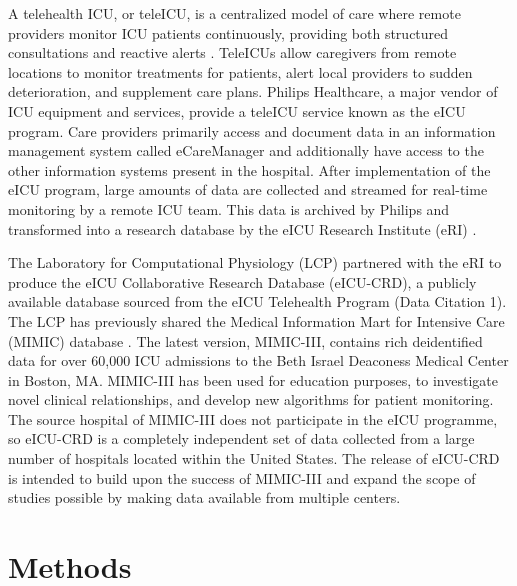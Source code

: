 \documentclass[english]{article}
\begin{document}
A telehealth ICU, or teleICU, is a centralized model of care where remote providers monitor ICU patients continuously, providing both structured consultations and reactive alerts \cite{lilly2014multicenter}. TeleICUs allow caregivers from remote locations to monitor treatments for patients, alert local providers to sudden deterioration, and supplement care plans.
Philips Healthcare, a major vendor of ICU equipment and services, provide a teleICU service known as the eICU program.
Care providers primarily access and document data in an information management system called eCareManager and additionally have access to the other information systems present in the hospital.
After implementation of the eICU program, large amounts of data are collected and streamed for real-time monitoring by a remote ICU team.
This data is archived by Philips and transformed into a research database by the eICU Research Institute (eRI) \cite{mcshea2010eicu}.


The Laboratory for Computational Physiology (LCP) partnered with the eRI to produce the eICU Collaborative Research Database (eICU-CRD), a publicly available database sourced from the eICU Telehealth Program (Data Citation 1).
The LCP has previously shared the Medical Information Mart for Intensive Care (MIMIC) database \cite{MIMIC2011, MIMIC2016}. The latest version, MIMIC-III, contains rich deidentified data for over 60,000 ICU admissions to the Beth Israel Deaconess Medical Center in Boston, MA. MIMIC-III has been used for education purposes, to investigate novel clinical relationships, and develop new algorithms for patient monitoring. The source hospital of MIMIC-III does not participate in the eICU programme, so eICU-CRD is a completely independent set of data collected from a large number of hospitals located within the United States. The release of eICU-CRD is intended to build upon the success of MIMIC-III and expand the scope of studies possible by making data available from multiple centers.

\section*{Methods}
\end{document}
